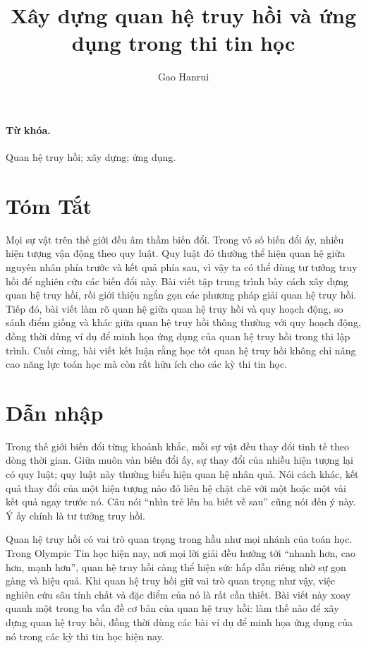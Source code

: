 \documentclass[11pt]{article}
\title{Xây dựng quan hệ truy hồi và ứng dụng trong thi tin học}
\author{Gao Hanrui}
\date{}
\begin{document}
\maketitle


\paragraph{Từ khóa.}
Quan hệ truy hồi; xây dựng; ứng dụng.

\section*{Tóm Tắt}

Mọi sự vật trên thế giới đều âm thầm biến đổi. Trong vô số biến đổi ấy, nhiều
hiện tượng vận động theo quy luật. Quy luật đó thường thể hiện quan hệ giữa
nguyên nhân phía trước và kết quả phía sau, vì vậy ta có thể dùng tư tưởng
truy hồi để nghiên cứu các biến đổi này. Bài viết tập trung trình bày cách
xây dựng quan hệ truy hồi, rồi giới thiệu ngắn gọn các phương pháp giải quan
hệ truy hồi. Tiếp đó, bài viết làm rõ quan hệ giữa quan hệ truy hồi và quy
hoạch động, so sánh điểm giống và khác giữa quan hệ truy hồi thông thường với
quy hoạch động, đồng thời dùng ví dụ để minh họa ứng dụng của quan hệ truy
hồi trong thi lập trình. Cuối cùng, bài viết kết luận rằng học tốt quan hệ
truy hồi không chỉ nâng cao năng lực toán học mà còn rất hữu ích cho các kỳ
thi tin học.

\tableofcontents

\section{Dẫn nhập}

Trong thế giới biến đổi từng khoảnh khắc, mỗi sự vật đều thay đổi tinh tế
theo dòng thời gian. Giữa muôn vàn biến đổi ấy, sự thay đổi của nhiều hiện
tượng lại có quy luật; quy luật này thường biểu hiện quan hệ nhân quả. Nói
cách khác, kết quả thay đổi của một hiện tượng nào đó liên hệ chặt chẽ với
một hoặc một vài kết quả ngay trước nó. Câu nói ``nhìn trẻ lên ba biết về sau''
cũng nói đến ý này. Ý ấy chính là tư tưởng truy hồi.

Quan hệ truy hồi có vai trò quan trọng trong hầu như mọi nhánh của toán học.
Trong Olympic Tin học hiện nay, nơi mọi lời giải đều hướng tới ``nhanh hơn,
cao hơn, mạnh hơn'', quan hệ truy hồi càng thể hiện sức hấp dẫn riêng nhờ sự
gọn gàng và hiệu quả. Khi quan hệ truy hồi giữ vai trò quan trọng như vậy,
việc nghiên cứu sâu tính chất và đặc điểm của nó là rất cần thiết. Bài viết
này xoay quanh một trong ba vấn đề cơ bản của quan hệ truy hồi: làm thế nào
để xây dựng quan hệ truy hồi, đồng thời dùng các bài ví dụ để minh họa ứng
dụng của nó trong các kỳ thi tin học hiện nay.
\end{document}
